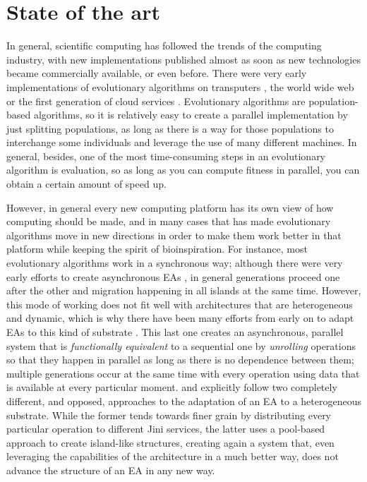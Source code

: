 \documentclass{llncs}
\begin{document}
  \section{State of the art}

  In general, scientific computing has followed the trends of the
  computing industry, with new implementations published almost as soon
  as new technologies became commercially available, or even
  before. There were very early implementations of evolutionary
  algorithms on transputers \cite{voigt1990modelling}, the world wide
  web \cite{chong:1999:jDGPi} or the first generation of cloud
  services
  \cite{DBLP:journals/corr/abs-1105-6205,de2017parallel,salza2017ccube}. Evolutionary
  algorithms are population-based algorithms, so it is relatively easy
  to create a parallel implementation by just splitting populations, as
  long as there is a way for those populations to interchange some
  individuals and leverage the use of many different machines. In
  general, besides, one of the most time-consuming steps in an
  evolutionary algorithm is evaluation, so as long as you can compute
  fitness in parallel, you can obtain a certain amount of speed up.

  However, in general every new computing platform has its own view of
  how computing should be made, and in many cases that has made
  evolutionary algorithms move in new directions in order to make them
  work better in that platform while keeping the spirit of
  bioinspiration. For instance, most evolutionary algorithms work in a
  synchronous way; although there were very early efforts to create
  asynchronous EAs \cite{coleman89}, in general
  generations proceed one after the other and migration happening in
  all islands at the same time. However, this mode of working does not
  fit well with architectures that are heterogeneous and dynamic, which
  is why there have been many efforts from early
  on to adapt EAs to this kind of substrate
  \cite{Jini:FEA2000,zorman2002creation,baugh2003asynchronous}. This
  last one creates an asynchronous, parallel system that is {\em functionally
    equivalent} to a sequential one by {\em unrolling} operations so
  that they happen in parallel as long as there is no dependence between
  them; multiple generations occur at the same time with every operation
  using data that is available at every particular
  moment. \cite{Jini:FEA2000} and \cite{zorman2002creation} explicitly
  follow two completely different, and opposed, approaches to the
  adaptation of an EA to a heterogeneous substrate. While the former
  tends towards finer grain by distributing every particular operation
  to different Jini services, the latter uses a pool-based approach to
  create island-like structures, creating again a system that, even
  leveraging the capabilities of the architecture in a much better way,
  does not advance the  structure of an EA in any new way.
\end{document}
